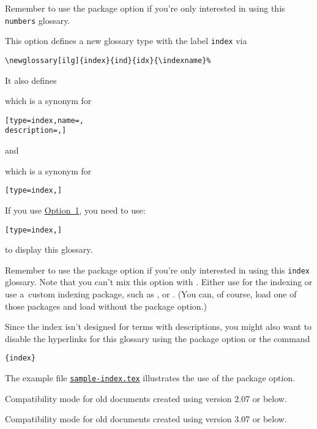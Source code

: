 \documentclass[report,inlinetitle]{nlctdoc}
\newcommand*{\opt}[1]{\hyperlink{option#1}{Option~#1}}
\newcounter{sample}
\newcommand*{\samplefile}[2][sample]{%
  \hyperref[ex:#1#2]{\texttt{#1#2.tex}}}
\begin{document}
\begin{description}
\begin{important}
Remember to use the  package option if you're only
interested in using this \texttt{numbers} glossary.
\end{important}

\item[\pkgopt{index}] This option defines a new glossary type with
the label \texttt{index} via
\begin{verbatim}
\newglossary[ilg]{index}{ind}{idx}{\indexname}%
\end{verbatim}
It also defines
\begin{definition}[\DescribeMacro\newterm]
\end{definition}
which is a synonym for
\begin{alltt}
[type=index,name=,%
description=,]
\end{alltt}
and
\begin{definition}[\DescribeMacro\printindex]
\end{definition}
which is a synonym for
\begin{alltt}
[type=index,]
\end{alltt}

If you use \opt1, you need to use:
\begin{alltt}
[type=index,]
\end{alltt}
to display this glossary.

\begin{important}
Remember to use the  package option if you're only
interested in using this \texttt{index} glossary. Note that you
can't mix this option with . Either use
 for the indexing or use a~custom indexing
package, such as ,  or .
(You can, of course, load one of those packages and 
load  without the  package option.)
\end{important}

Since the index isn't designed for terms with descriptions, you
might also want to disable the hyperlinks for this glossary using
the package option  or the command
\begin{display}
\verb|{index}|
\end{display}

The example file \samplefile{-index} illustrates the use of the
 package option.

\item[\pkgopt{compatible-2.07}] Compatibility mode for old documents
created using version 2.07 or below.

\item[\pkgopt{compatible-3.07}] Compatibility mode for old documents
created using version 3.07 or below.

\end{description}
\end{document}
